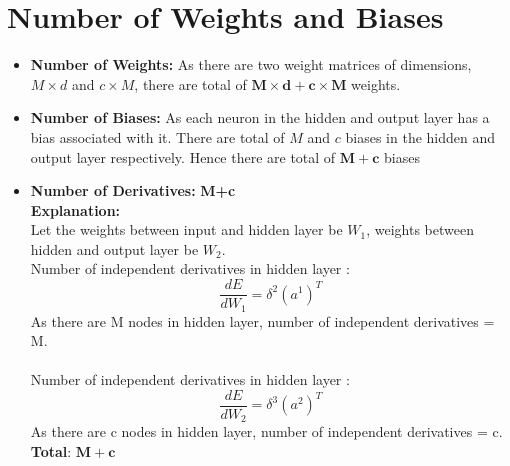 \documentclass[english,a4paper,12pt]{article}
\begin{document}
\section{Number of Weights and Biases}{
\begin{itemize}
    \item \textbf{Number of Weights:} As there are two weight matrices of dimensions, $M\times d$ and $c \times M$, there are total of $\mathbf{M \times d + c \times M}$ weights.
    \item \textbf{Number of Biases:} As each neuron in the hidden and output layer has a bias associated with it. There are total of $M$ and $c$ biases in the hidden and output layer respectively. Hence there are total of $\mathbf{M+c}$ biases
    \item \textbf{Number of Derivatives:} \textbf{M+c}  \\
    \textbf{Explanation: } \\
Let the weights between input and hidden layer be $W_1$, weights between hidden and output layer be $W_2$.\\
Number of independent derivatives in hidden layer :\\
 $$\frac{d E}{dW_{1}}=\delta^{2}(a^{1})^{T}$$
As there are M nodes in hidden layer, number of independent derivatives = M.\\\\
Number of independent derivatives in hidden layer :\\
 $$\frac{d E}{dW_{2}}=\delta^{3}(a^{2})^{T}$$
As there are c nodes in hidden layer, number of independent derivatives = c.\\
\textbf{Total}: $\mathbf{M+c}$
\end{itemize}
}
\end{document}
